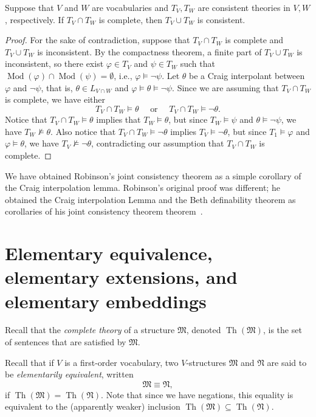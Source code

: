 \documentclass{scrartcl}
\DeclareMathOperator{\Mod}{Mod}
\DeclareMathOperator{\Th}{Th}
\renewcommand{\phi}{\varphi}
\newcommand{\FM}{\mathfrak{M}}
\begin{document}
\begin{theorem}
\label{T:Joint Consistency}
Suppose that $V$ and $W$ are vocabularies and $T_V, T_W$ are consistent theories in $V,W$, respectively. If 
$T_V\cap T_W$ is complete, then $T_V \cup T_W$ is consistent.
\end{theorem}

\begin{proof}
For the sake of contradiction, suppose that $T_V \cap T_W$ is complete and $T_V\cup T_W$ is inconsistent. By the compactness theorem, a finite part of $T_V\cup T_W$ is inconsistent, so there exist $\phi\in T_V $ and $\psi\in T_W$ such that 
$\Mod(\phi)\cap\Mod(\psi)=\emptyset$, i.e., $\phi\models\neg\psi$. Let $\theta$ be a Craig interpolant between $\phi$ and $\neg\psi$, that is, $\theta\in L_{V\cap W}$ and $\phi\models\theta\models\neg\psi$.  Since we are assuming that $T_V\cap T_W$ is complete, we have either \[
T_V\cap T_W\models \theta \quad\text{ or }\quad T_V\cap T_W\models \neg\theta.
\]
Notice that $T_V\cap T_W\models\theta$ implies that $T_W\models\theta$, but since $T_W\models\psi$ and $\theta\models\neg\psi$, we have $T_W\not\models\theta$. Also notice that $T_V\cap T_W\models\neg\theta$ implies $T_V\models\neg\theta$, but since $T_1\models\phi$ and $\phi\models\theta$, we have $T_V\not\models\neg\theta$, contradicting our assumption that $T_V\cap T_W$ is complete. 
\end{proof}


\begin{history}
We have obtained Robinson's joint consistency theorem as a simple corollary of the Craig interpolation lemma. Robinson's original proof was different; he obtained the Craig interpolation Lemma and the Beth definability theorem as  corollaries of his joint consistency theorem theorem~\cite{Robinson:1956}.
\end{history}


\section{Elementary equivalence, elementary extensions, and elementary embeddings}

Recall that the \emph{complete theory} of a structure $\FM$, denoted $\Th(\FM)$, is the set of sentences that are satisfied by $\FM$.

Recall that if $V$ is a first-order vocabulary, two $V$-structures $\mathfrak{M}$ and $\mathfrak{N}$ are said to be \emph{elementarily equivalent}, written
\[
\mathfrak{M}\equiv\mathfrak{N},
\]
if $\Th(\mathfrak{M})=\Th(\mathfrak{N})$. Note that since we have negations, this equality is equivalent to the (apparently weaker) inclusion $\Th(\mathfrak{M})\subseteq\Th(\mathfrak{N})$.
\end{document}
